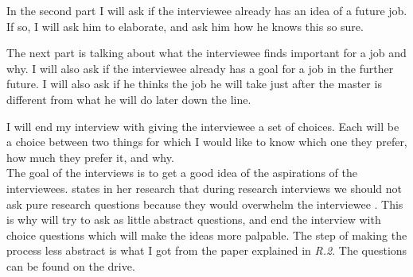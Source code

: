 \documentclass[]{article}
\begin{document}
In the second part I will ask if the interviewee already has an idea of a future
job. If so, I will ask him to elaborate, and ask him how he knows this so sure. 

The next part is talking about what the interviewee finds important for a job 
and why. I will also ask if the interviewee already has a goal for a job in the 
further future. I will also ask if he thinks the job he will take just after the 
master is different from what he will do later down the line. 

I will end my interview with giving the interviewee a set of choices. Each 
will be a choice between two things for which I would like to know which one they
prefer, how much they prefer it, and why.\\

The goal of the interviews is to get a good idea of the aspirations of the 
interviewees. \citeauthor[]{castillo2016preparing} states in her research that 
during research interviews we should not ask pure research questions because they
would overwhelm the interviewee \cite{castillo2016preparing}. 
This is why will try to ask as little abstract questions, 
and end the interview with choice questions which will make the ideas more palpable. 
The step of making the process less abstract is what I got from the paper 
explained in \textit{R.2}. The questions can be found on the drive.
\end{document}
